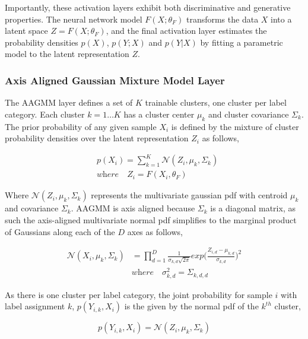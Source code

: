 \documentclass[10pt,twocolumn,letterpaper]{article}
\begin{document}
Importantly, these activation layers exhibit both discriminative and generative properties. 
The neural network model $F(X;\theta_F)$ transforms the data $X$ into a latent space $Z = F(X;\theta_F)$, and the final activation layer estimates the probability densities $p(X)$, $p(Y;X)$ and $p(Y|X)$ by fitting a parametric model to the latent representation $Z$.

\subsubsection{Axis Aligned Gaussian Mixture Model Layer}

The AAGMM layer defines a set of $K$ trainable clusters, one cluster per label category. 
Each cluster $k=1 \dots K$ has a cluster center $\mu_k$ and cluster covariance $\Sigma_k$. 
The prior probability of any given sample $X_i$ is defined by the mixture of cluster probability densities over the latent representation $Z_i$ as follows,

\begin{equation}
	\begin{aligned}
		\label{eq_px}
		&p(X_i) = \sum_{k=1}^K \mathcal{N} (Z_i, \mu_{k}, \Sigma_k)
		\\[10pt]
		&\textit{where} \quad Z_i = F(X_i, \theta_F)
	\end{aligned}
\end{equation}

Where $\mathcal{N}(Z_i, \mu_k, \Sigma_k)$ represents the multivariate gaussian pdf with centroid $\mu_k$ and covariance $\Sigma_k$. 
AAGMM is axis aligned because $\Sigma_k$ is a diagonal matrix, as such the axis-aligned multivariate normal pdf simplifies to the marginal product of Gaussians along each of the $D$ axes as follows,

\begin{equation}
	\begin{aligned}
		\mathcal{N} (X_i, \mu_{k}, \Sigma_k) &=  \prod_{d=1}^D \frac{1}{\sigma_{k,d}\sqrt{2 \pi}} exp \Big( \frac{Z_{i,d} - \mu_{k,d}} {\sigma_{k,d}} \Big)^2 \\[10pt]
		&\textit{where} \quad \sigma^2_{k,d} = \Sigma_{k,d,d}
	\end{aligned}
\end{equation}

As there is one cluster per label category, the joint probability for sample $i$ with label assignment $k$, $p(Y_{i,k},X_i)$ is the given by the normal pdf of the $k^{th}$ cluster,

\begin{equation}
	\label{eq_pyx}
	p(Y_{i,k},X_i) = \mathcal{N} (Z_i, \mu_{k}, \Sigma_k) \end{equation}
\end{document}
